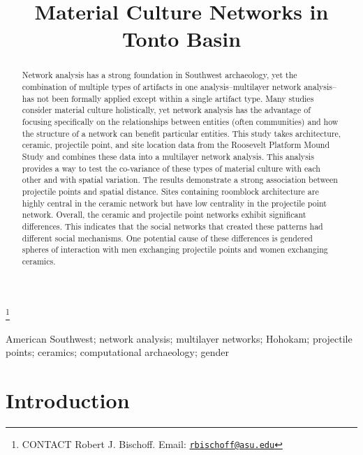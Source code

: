 \documentclass[]{interact}
\theoremstyle{plain}%
\theoremstyle{definition}
\theoremstyle{remark}
\begin{document}
\articletype{}

\title{Material Culture Networks in Tonto Basin}


\author{
}

\thanks{CONTACT Robert J.
Bischoff. Email: \href{mailto:rbischoff@asu.edu}{\nolinkurl{rbischoff@asu.edu}}}

\maketitle

\begin{abstract}
Network analysis has a strong foundation in Southwest archaeology, yet
the combination of multiple types of artifacts in one
analysis--multilayer network analysis--has not been formally applied
except within a single artifact type. Many studies consider material
culture holistically, yet network analysis has the advantage of focusing
specifically on the relationships between entities (often communities)
and how the structure of a network can benefit particular entities. This
study takes architecture, ceramic, projectile point, and site location
data from the Roosevelt Platform Mound Study and combines these data
into a multilayer network analysis. This analysis provides a way to test
the co-variance of these types of material culture with each other and
with spatial variation. The results demonstrate a strong association
between projectile points and spatial distance. Sites containing
roomblock architecture are highly central in the ceramic network but
have low centrality in the projectile point network. Overall, the
ceramic and projectile point networks exhibit significant differences.
This indicates that the social networks that created these patterns had
different social mechanisms. One potential cause of these differences is
gendered spheres of interaction with men exchanging projectile points
and women exchanging ceramics.
\end{abstract}

\begin{keywords}
American Southwest; network analysis; multilayer networks; Hohokam;
projectile points; ceramics; computational archaeology; gender
\end{keywords}

\hypertarget{introduction}{%
\section*{Introduction}\label{introduction}}
\end{document}
